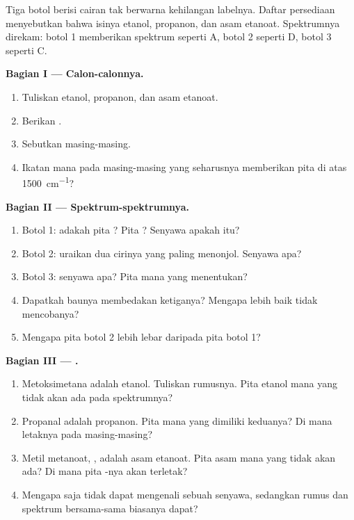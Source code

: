 \begin{problem}
\label{pb:g11:infrared:1}
Tiga botol berisi cairan tak berwarna kehilangan labelnya. Daftar
persediaan menyebutkan bahwa isinya etanol, propanon, dan asam etanoat.
Spektrumnya direkam: botol 1 memberikan spektrum seperti A, botol 2
seperti D, botol 3 seperti C.

\medskip
\noindent\textbf{Bagian I --- Calon-calonnya.}
\begin{enumerate}
  \item Tuliskan  etanol, propanon, dan asam
        etanoat.
  \item Berikan .
  \item Sebutkan  masing-masing.
  \item Ikatan mana pada masing-masing yang seharusnya memberikan pita di
        atas \qty{1500}{cm^{-1}}?
\end{enumerate}

\medskip
\noindent\textbf{Bagian II --- Spektrum-spektrumnya.}
\begin{enumerate}[resume]
  \item Botol 1: adakah pita ? Pita ? Senyawa apakah
        itu?
  \item Botol 2: uraikan dua cirinya yang paling menonjol. Senyawa apa?
  \item Botol 3: senyawa apa? Pita mana yang menentukan?
  \item Dapatkah baunya membedakan ketiganya? Mengapa lebih baik tidak
        mencobanya?
  \item Mengapa pita  botol 2 lebih lebar daripada pita botol 1?
\end{enumerate}

\medskip
\noindent\textbf{Bagian III --- .}
\begin{enumerate}[resume]
  \item Metoksimetana adalah  etanol. Tuliskan rumusnya. Pita
        etanol mana yang tidak akan ada pada spektrumnya?
  \item Propanal adalah  propanon. Pita mana yang dimiliki
        keduanya? Di mana letaknya pada masing-masing?
  \item Metil metanoat, , adalah  asam etanoat. Pita
        asam mana yang tidak akan ada? Di mana pita -nya akan
        terletak?
  \item Mengapa  saja tidak dapat mengenali sebuah senyawa,
        sedangkan rumus dan spektrum bersama-sama biasanya dapat?
\end{enumerate}


\end{problem}
